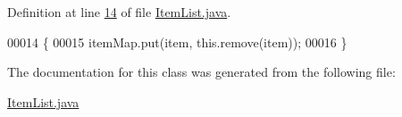 Definition at line \hyperlink{ItemList_8java_source_l00014}{14} of file \hyperlink{ItemList_8java_source}{Item\-List.\-java}.


\begin{DoxyCode}
00014                                                                      \{
00015         itemMap.put(item, this.remove(item));
00016     \}
\end{DoxyCode}


The documentation for this class was generated from the following file\-:\begin{DoxyCompactItemize}
\item 
\hyperlink{ItemList_8java}{Item\-List.\-java}\end{DoxyCompactItemize}
